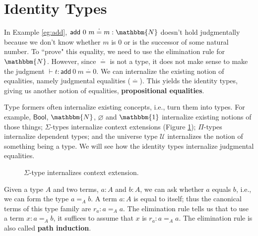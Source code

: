 \documentclass{amsart}
\theoremstyle{definition}
\newcommand{\N}{\mathbbm{N}}
\newcommand{\type}{\ensuremath{\mathsf{~type}}}
\newcommand{\defeq}{\ensuremath{\overset{\boldsymbol{\cdot}}{=}}}
\newcommand{\Bool}{\ensuremath{\mathsf{Bool}}}
\newcommand{\U}{\ensuremath{\mathcal{U}}}
\newcommand{\Ind}{\ensuremath{\mathsf{ind}}}
\renewcommand{\emph}{\textbf}
\begin{document}
\section{Identity Types}\label{sec:identity-types}
In Example \ref{eg:add}, $\mathsf{add}~0~m \defeq m : \N$ doesn't hold judgmentally because we don't know whether $m$ is 0 or is the successor of some natural number.
To ``prove" this equality, we need to use the elimination rule for $\N$.
However, since $\defeq$ is not a type, it does not make sense to make the judgment $\vdash t : \mathsf{add}~0~m \defeq 0$.
We can internalize the existing notion of equalities, namely judgmental equalities ($\defeq$).
This yields the identity types, giving us another notion of equalities, \emph{propositional equalities}.

Type formers often internalize existing concepts, i.e., turn them into types. For example, $\Bool$, $\N$, $\varnothing$ and $\mathbbm{1}$ internalize existing notions of those things; $\Sigma$-types internalize context extensions (Figure \ref{fig:internalize}); $\Pi$-types internalize dependent types; and the universe type $\U$ internalizes the notion of something being a type. 
We will see how the identity types internalize judgmental equalities.

\begin{figure}[h]
    \centering
    
    \caption{$\Sigma$-type internalizes context extension.}
    \label{fig:internalize}
\end{figure}

Given a type $A$ and two terms, $a : A$ and $b : A$, we can ask whether $a$ equals $b$, i.e., we can form the type $a =_{A} b$.
A term $a : A$ is equal to itself; thus the canonical terms of this type family are $r_{a} : a =_{A} a$.
The elimination rule tells us that to use a term $x : a =_{A} b$, it suffices to assume that $x$ is $r_{a} : a =_{A} a$.
The elimination rule is also called \emph{path induction}.

\end{document}
